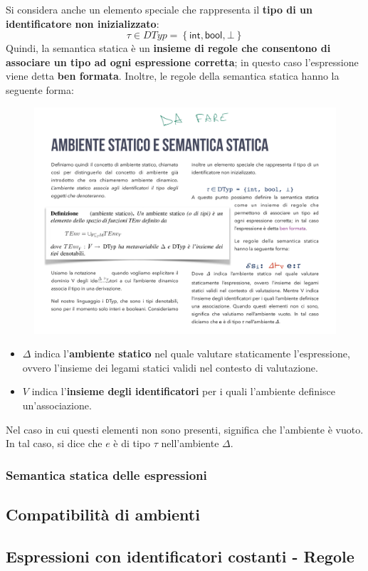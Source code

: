 \documentclass[a4paper]{article}
\begin{document}
	\noindent
	Si considera anche un elemento speciale che rappresenta il \textbf{tipo di un identificatore non inizializzato}:
	\begin{equation*}
		\tau \in DTyp = \left\{\textsf{int}, \textsf{bool}, \bot\right\}
	\end{equation*}
	Quindi, la semantica statica è un \textbf{insieme di regole che consentono di associare un tipo ad ogni espressione corretta}; in questo caso l'espressione viene detta \textcolor{Red3}{\textbf{ben formata}}. Inoltre, le regole della semantica statica hanno la seguente forma:
	\begin{figure}[!htp]
		\centering
		\includegraphics[width=.3\textwidth]{img/semantica_statica.pdf}
	\end{figure}
	
	\noindent
	\begin{itemize}
		\item $\Delta$ indica l'\textbf{ambiente statico} nel quale valutare staticamente l'espressione, ovvero l'insieme dei legami statici validi nel contesto di valutazione.
		
		\item $V$ indica l'\textbf{insieme degli identificatori} per i quali l'ambiente definisce un'associazione.
	\end{itemize}
	Nel caso in cui questi elementi non sono presenti, significa che l'ambiente è vuoto. In tal caso, si dice che $e$ è di tipo $\tau$ nell'ambiente $\Delta$.

	\subsubsection{Semantica statica delle espressioni}
	
	\subsection{Compatibilità di ambienti}
	
	\subsection{Espressioni con identificatori costanti - Regole}
\end{document}
